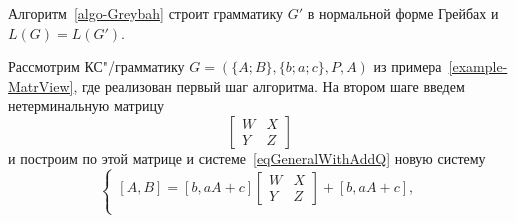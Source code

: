 \begin{mytheorem}
\label{theorem-AlgoGreybahCorrectness}
Алгоритм~\ref{algo-Greybah} строит грамматику $G'$ в нормальной форме Грейбах и $L(G)=L(G')$.
\end{mytheorem}

\begin{myexample}
Рассмотрим КС"/грамматику $G=(\{A;B\},\{b;a;c\},P,A)$ из примера~\ref{example-MatrView}, где реализован первый шаг алгоритма. На втором шаге введем нетерминальную матрицу
\[
    \begin{bmatrix}
        W & X \\
        Y & Z
    \end{bmatrix}
\]
и построим по этой матрице и системе~\ref{eqGeneralWithAddQ} новую систему
\begin{equation}
\label{eq625}
    \begin{cases}
        [A,B]
            = [b,aA+c]
            \begin{bmatrix}
                W & X \\
                Y & Z
            \end{bmatrix}
            + [b,aA+c], \\


\end{cases}
\end{equation}
\end{myexample}
